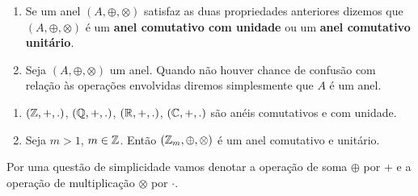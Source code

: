 \documentclass{beamer}
\begin{document}
    \begin{frame}
        \begin{observacoes}
            \begin{enumerate}[label={\arabic*})]
                \conti

                \item Se um anel $(A, \oplus, \otimes)$ \pause satisfaz as duas propriedades anteriores \pause dizemos
                    que $(A, \oplus, \otimes)$ é um \textbf{anel comutativo com unidade} \pause ou um \textbf{anel
                    comutativo unitário}.\pause

                \vspace{.5cm}

                \item Seja $(A, \oplus, \otimes)$ um anel. \pause Quando não houver chance de confusão com
                    relação às operações envolvidas diremos simplesmente que \pause $A$ é um anel.\pause
            \end{enumerate}
        \end{observacoes}
    \end{frame}

    \begin{frame}
        \begin{exemplos}
            \begin{enumerate}[label={\arabic*})]
                \item $(\mathbb{Z},+,.)$, \pause $(\mathbb{Q},+,.)$, \pause $(\mathbb{R},+,.)$, \pause $(\mathbb{C},+,.)$ são anéis
                    comutativos \pause e com unidade.\pause

                \vspace{1cm}

                \item Seja $m > 1$, $m \in \mathbb{Z}$. \pause Então $(\mathbb{Z}_m, \oplus, \otimes)$ é um anel \pause comutativo e unitário.\pause
            \end{enumerate}
        \end{exemplos}

        \vspace{0.5cm}

        \begin{observacao}
            Por uma questão de simplicidade vamos denotar a operação de soma $\oplus$ por $+$ \pause e a operação de multiplicação $\otimes$ por $\cdot$.
        \end{observacao}

    \end{frame}
\end{document}
